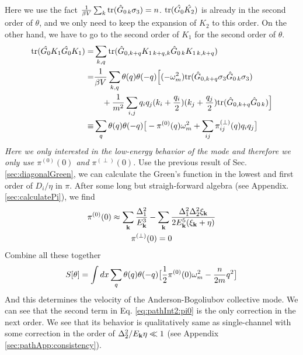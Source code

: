 Here we use the fact $\frac{1}{{\beta{}V}}\sum_{k}\text{tr}(\hat{G}_{0\,k}\sigma_3)=n$. $\text{tr}(\hat{G_{0}}\hat{K_2})$ is already in the second order of $\theta$, and we only need to keep the expansion of $K_2$ to this order. On the other hand, we have to go to the second order of $K_1$ for the second order of $\theta$. 
\begin{align}		
\text{tr}(\hat{G_{0}}{K_1}\hat{G_{0}}{K_1})=&\sum_{k,q}\text{tr}(\hat{G}_{0,k+q}K_{1\,k+q,k}\hat{G}_{0\,k}K_{1\,k,k+q})\\
=&\frac{1}{{\beta{}V}}\sum_{k,q}\theta(q)\theta(-q)\Big[(-\omega_m^2)\text{tr}(\hat{G}_{0,k+q}\sigma_3\hat{G}_{0\,k}\sigma_3)\nonumber\\
&\quad+\frac{1}{m^2}\sum_{i,j}q_iq_j(k_i+\frac{q_i}{2})(k_j+\frac{q_j}{2})\text{tr}(\hat{G}_{0,k+q}\hat{G}_{0\,k})\Big]\nonumber\\
\equiv&\sum_{q}\theta(q)\theta(-q)\big[-\pi^{(0)}(q)\omega_m^2+\sum_{ij}\pi^{(\perp)}_{ij}(q)q_iq_j\big]
\end{align}
\emph{Here we only interested in the low-energy behavior of the mode and therefore we only use $\pi^{(0)}(0)$ and $\pi^{(\perp)}(0)$.} Use the previous result of Sec. \ref{sec:diagonalGreen}, we can calculate the Green's function in the lowest and first order of $D_i/\eta$ in $\pi$.  After some long but straigh-forward algebra (see Appendix. \ref{sec:calculatePi}), we find
\begin{gather}
\pi^{(0)}(0)\approx\sum_{\mathbf{k}}\frac{\Delta_{1}^{2}}{E_{\mathbf{k}}^{3}}-\sum_{\mathbf{k}}\frac{\Delta_{1}^{2}\Delta_{2}^{2}\xi_{\mathbf{k}}}{2E_{\mathbf{k}}^{5}(\xi_{\mathbf{k}}+\eta)}
\label{eq:pathInt2:pi0}\\
\pi^{(\perp)}(0)=0
\end{gather}
Combine all these together
\begin{equation}
S[\theta]=\int{dx}\sum_{q}\theta(q)\theta(-q)\big[\frac{1}{2}\pi^{(0)}(0)\omega_m^2-\frac{n}{2m}q^2\big]
\end{equation}
And this determines the velocity of the Anderson-Bogoliubov collective mode.  We can see that  the second term in Eq. \eqref{eq:pathInt2:pi0} is the only correction in the next order.  We see that its behavior is qualitatively same as  single-channel with some correction in the order of $\Delta_{2}^2/E_{\mathbf{k}}\eta\ll1$ (see Appendix \ref{sec:pathApp:consistency}).


\begin{subappendices}

\end{subappendices}






